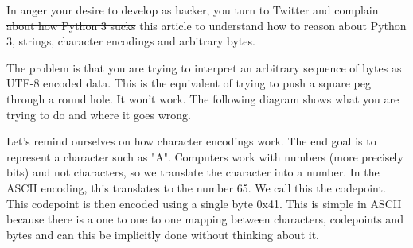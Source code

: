 \documentclass[twocolumn]{article}
\begin{document}
In \sout{anger} your desire to develop as hacker, you turn to \sout{Twitter and complain about how Python 3 sucks} this article to understand how to reason about Python 3, strings, character encodings and arbitrary bytes.

The problem is that you are trying to interpret an arbitrary sequence of bytes as UTF-8 encoded data. This is the equivalent of trying to push a square peg through a round hole. It won't work. The following diagram shows what you are trying to do and where it goes wrong.
\vspace{1mm}


\vfill\null


Let's remind ourselves on how character encodings work. The end goal is to represent a character such as "A". Computers work with numbers (more precisely bits) and not characters, so we translate the character into a number. In the ASCII encoding, this translates to the number 65. We call this the codepoint. This codepoint is then encoded using a single byte 0x41. This is simple in ASCII because there is a one to one to one mapping between characters, codepoints and bytes and can this be implicitly done without thinking about it.
\end{document}
